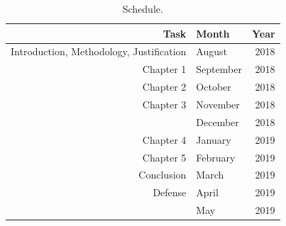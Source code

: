 \documentclass[12pt,twoside,a4paper]{book}
\numberwithin{equation}{section}
\theoremstyle{remark}
\begin{document}
\begin{table}[h]
\centering

\begin{tabular}{|r|lr|}
\hline
Task & Month&Year \\ 
\hline                               
Introduction, Methodology, Justification & August & 2018 \\
Chapter 1& September & 2018 \\
Chapter 2 &October & 2018 \\
Chapter 3&November & 2018 \\
 &December & 2018 \\
Chapter 4&January & 2019 \\
Chapter 5&February & 2019 \\
Conclusion&March & 2019 \\
Defense&April & 2019 \\
 &May & 2019   \\ 
\hline
\end{tabular}
\caption{Schedule.}
\label{tab:schedule}
\end{table}
\end{document}
